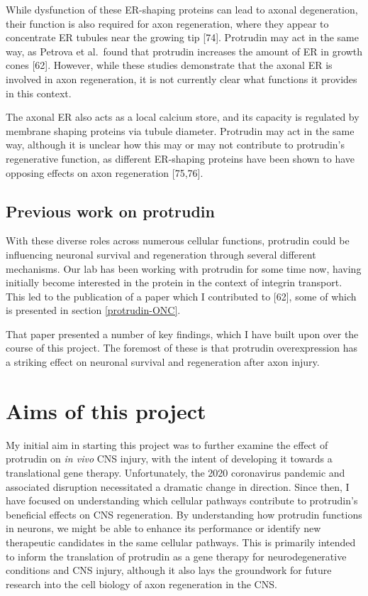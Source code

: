 \documentclass[
  12pt,
  a4paper,
]{book}
\begin{document}
While dysfunction of these ER-shaping proteins can lead to axonal degeneration, their function is also required for axon regeneration, where they appear to concentrate ER tubules near the growing tip {[}74{]}. Protrudin may act in the same way, as Petrova et al.~found that protrudin increases the amount of ER in growth cones {[}62{]}. However, while these studies demonstrate that the axonal ER is involved in axon regeneration, it is not currently clear what functions it provides in this context.

The axonal ER also acts as a local calcium store, and its capacity is regulated by membrane shaping proteins via tubule diameter. Protrudin may act in the same way, although it is unclear how this may or may not contribute to protrudin's regenerative function, as different ER-shaping proteins have been shown to have opposing effects on axon regeneration {[}75,76{]}.

\hypertarget{previous-work-on-protrudin}{%
\subsection{Previous work on protrudin}\label{previous-work-on-protrudin}}

With these diverse roles across numerous cellular functions, protrudin could be influencing neuronal survival and regeneration through several different mechanisms. Our lab has been working with protrudin for some time now, having initially become interested in the protein in the context of integrin transport. This led to the publication of a paper which I contributed to {[}62{]}, some of which is presented in section \ref{protrudin-ONC}.

That paper presented a number of key findings, which I have built upon over the course of this project. The foremost of these is that protrudin overexpression has a striking effect on neuronal survival and regeneration after axon injury.

\hypertarget{intro-aims}{%
\section{Aims of this project}\label{intro-aims}}

My initial aim in starting this project was to further examine the effect of protrudin on \emph{in vivo} CNS injury, with the intent of developing it towards a translational gene therapy. Unfortunately, the 2020 coronavirus pandemic and associated disruption necessitated a dramatic change in direction. Since then, I have focused on understanding which cellular pathways contribute to protrudin's beneficial effects on CNS regeneration. By understanding how protrudin functions in neurons, we might be able to enhance its performance or identify new therapeutic candidates in the same cellular pathways. This is primarily intended to inform the translation of protrudin as a gene therapy for neurodegenerative conditions and CNS injury, although it also lays the groundwork for future research into the cell biology of axon regeneration in the CNS.
\end{document}
